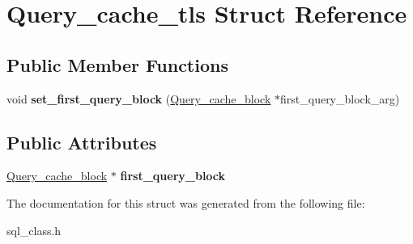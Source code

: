 \hypertarget{structQuery__cache__tls}{}\section{Query\+\_\+cache\+\_\+tls Struct Reference}
\label{structQuery__cache__tls}
\subsection*{Public Member Functions}
\begin{DoxyCompactItemize}
\item 
\mbox{\label{structQuery__cache__tls_afb39a28d3af9969464b70fb4db371803}} 
void {\bfseries set\+\_\+first\+\_\+query\+\_\+block} (\mbox{\hyperlink{structQuery__cache__block}{Query\+\_\+cache\+\_\+block}} $\ast$first\+\_\+query\+\_\+block\+\_\+arg)
\end{DoxyCompactItemize}
\subsection*{Public Attributes}
\begin{DoxyCompactItemize}
\item 
\mbox{\label{structQuery__cache__tls_a94b2f2df838ce64c89d35c5ac4b59758}} 
\mbox{\hyperlink{structQuery__cache__block}{Query\+\_\+cache\+\_\+block}} $\ast$ {\bfseries first\+\_\+query\+\_\+block}
\end{DoxyCompactItemize}


The documentation for this struct was generated from the following file\+:\begin{DoxyCompactItemize}
\item 
sql\+\_\+class.\+h\end{DoxyCompactItemize}
